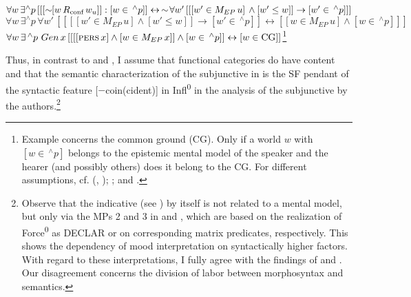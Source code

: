 \documentclass[output=paper,colorlinks,citecolor=brown]{langscibook}
\begin{document}
\begin{otherlanguage}{english}
\begin{exe}
\ex	\label{ex:16:19}
\begin{xlist}
\ex $\forall w \, \exists ^{\wedge}p \, [[[\sim \negthinspace \negthinspace [w \, R_\text{conf} \, w_{u}]] : [w \in \, ^{\wedge}p]] \leftrightarrow \, \sim \negthinspace  \forall w' \, [[[w' \in M_{EP} \, u] \, \wedge \newline [w' \leq w]] \to [w' \in \, ^{\wedge}p]]]       $
\ex $ \forall w \, \exists ^{\wedge}p \, \forall w' \, [[[[w' \in M_{EP} \, u] \wedge [w' \leq w]] \to [w' \in \, ^{\wedge}p]] \leftrightarrow [[w  \in M_{EP} \, u] \wedge [w \in \, ^{\wedge}p]]]    $
\ex $\forall w  \,\exists \, ^{\wedge}p \, \, Gen\,x \, [[[[\textsc{pers} \, x] \wedge [w \in M_{EP} \, x]]  \wedge [w \in \, ^{\wedge}p]] \leftrightarrow [w \in \text{CG}]]$\footnote{Example  concerns the common ground (CG). Only if a world $w$ with $[w \in \, ^{\wedge}p]$ belongs to the epistemic mental model of the speaker and the hearer (and possibly others) does it belong to the CG. For different assumptions, cf. \citeauthor{Portner2007} (\citeyear{Portner2007}, \citeyear{Portner2009}); \textcite{Zanuttini-Pak-etal2012}; and \textcite{Ambar2016}.\label{fn26}}\label{ex:16:19c}
\end{xlist}
\end{exe}

\noindent Thus, in contrast to \textcite{Wiltschko2016} and \textcite{Chrisodoulou-Wiltschko2012}, I assume that functional categories do have content and that the semantic characterization of the subjunctive in  is the SF pendant of the syntactic feature [$-$coin(cident)] in Infl\textsuperscript{0} in the analysis of the subjunctive by the authors.\footnote{Observe that the indicative (see ) by itself is not related to a mental model, but only via the MPs 2 and 3 in  and , which are based on the realization of Force\textsuperscript{0} as DECLAR or on corresponding matrix predicates, respectively. This shows the dependency of mood interpretation on syntactically higher factors. With regard to these interpretations, I fully agree with the findings of \textcite{Wiltschko2016} and \textcite{Chrisodoulou-Wiltschko2012}. Our disagreement concerns the division of labor between morphosyntax and semantics.\label{fn27}}


\end{otherlanguage}
\end{document}
